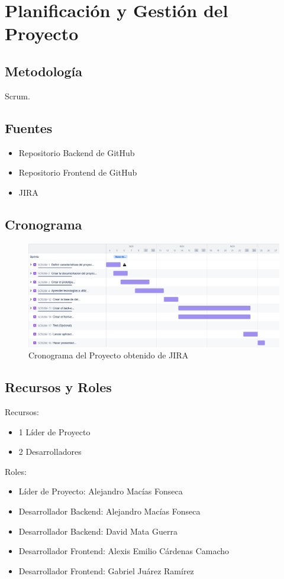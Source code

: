 	\chapter{Planificación y Gestión del Proyecto}

	\section{Metodología}
	Scrum.

	\section{Fuentes}
	\begin{itemize}
		\item Repositorio Backend de GitHub
		\item Repositorio Frontend de GitHub
		\item JIRA
	\end{itemize}

	\section{Cronograma}
	\begin{figure}[h]
		\centering
		\includegraphics[width=1\linewidth]{./images/proyecto_final_ingr_2024-11-05_11.32am}
		\caption{Cronograma del Proyecto obtenido de JIRA}
	\end{figure}
	
	\section{Recursos y Roles}
	Recursos:
	\begin{itemize}
		\item 1 Líder de Proyecto
		\item 2 Desarrolladores
	\end{itemize}

	Roles: 
	\begin{itemize}
		\item Líder de Proyecto: Alejandro Macías Fonseca
		\item Desarrollador Backend: Alejandro Macías Fonseca
		\item Desarrollador Backend: David Mata Guerra
		\item Desarrollador Frontend: Alexis Emilio Cárdenas Camacho
		\item Desarrollador Frontend: Gabriel Juárez Ramírez
	\end{itemize}
	
